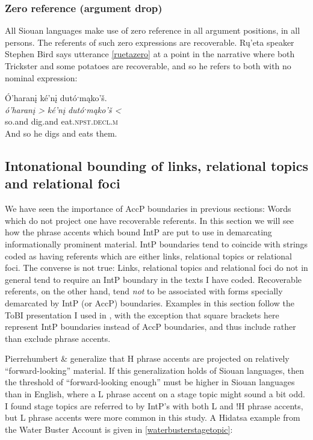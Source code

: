 \documentclass[output=paper]{LSP/langsci}
\begin{document}
\subsubsection{Zero reference (argument drop)}\label{zeroreference}

	All Siouan languages make use of zero reference in all argument positions, in all persons. The referents of such zero expressions are recoverable. Rų’eta speaker Stephen Bird says utterance \ref{ruetazero} at a point in the narrative where both Trickster and some potatoes are recoverable, and so he refers to both with no nominal expression:
	
\ea\label{ruetazero}
 	Ó’haranį ké’nį dutóˑmąko’š.\footnotemark\\
\gll 	\emph{ó’haranį >}	\emph{ké’nį}		\emph{dutóˑmąko’š <}\\
	so.and		dig.and		eat.\textsc{npst.decl.m}\\
\glt	And so he digs and eats them.
\z

\subsection{Intonational bounding of links, relational topics and relational foci}\label{intonationalbounding}
	
	We have seen the importance of AccP boundaries in previous sections: Words which do not project one have recoverable referents. In this section we will see how the phrase accents which bound IntP are put to use in demarcating informationally prominent material. IntP boundaries tend to coincide with strings coded as having referents which are either links, relational topics or relational foci. The converse is not true: Links, relational topics and relational foci do not in general tend to require an IntP boundary in the texts I have coded. Recoverable referents, on the other hand, tend \emph{not} to be associated with forms specially demarcated by IntP (or AccP) boundaries. Examples in this section follow the ToBI presentation I used in , with the exception that square brackets here represent IntP boundaries instead of AccP boundaries, and thus include rather than exclude phrase accents.
	
	Pierrehumbert \& \citet{Hirschberg1990} generalize that H phrase accents are projected on relatively “forward-looking” material. If this generalization holds of Siouan languages, then the threshold of “forward-looking enough” must be higher in Siouan languages than in English, where a L phrase accent on a stage topic might sound a bit odd. I found stage topics are referred to by IntP’s with both L and !H phrase accents, but L phrase accents were more common in this study. A Hidatsa example from the Water Buster Account is given in \ref{waterbusterstagetopic}:
	
\end{document}
